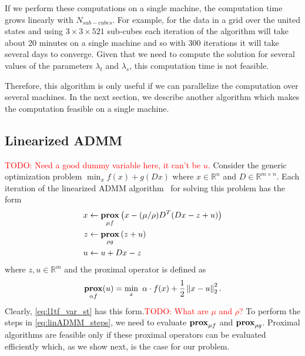 \documentclass{article}
\newcommand{\attn}[1]{\textcolor{red}{TODO: #1}}
\newcommand{\norm}[1]{\left\lVert #1 \right\rVert}
\DeclareMathOperator*{\prox}{\bf prox}
\begin{document}
If we perform these computations on a single machine, the computation
time grows linearly with $N_{sub-cubes}$. For example, for the data in
a grid over the united states and using $3\times3\times521$ sub-cubes
each iteration of the algorithm will take about 20 minutes on a single
machine and so with 300 iterations it will take several days to
converge. Given that we need to compute the solution for several
values of the parameters $\lambda_t$ and $\lambda_s$, this computation
time is not feasible. 

Therefore, this algorithm is only useful if we can parallelize the
computation over several machines. In the next section, we describe
another algorithm which makes the computation feasible on a single
machine. 

\subsection{Linearized ADMM}
\label{sec:linADMM}


\attn{Need a good dummy variable here, it can't be $u$.} Consider the generic optimization problem
$\min_x f(x)+g(Dx)$
where $x\in \mathbb{R}^n$ and $D\in \mathbb{R}^{m\times n}$. Each
iteration of the linearized ADMM
algorithm~\citep{parikh_proximal_2014} for solving this problem 
has the form
\begin{align}
x & \leftarrow \prox_{\mu f} \left(x - (\mu/\rho)D^T (D x - z + u )\right)\\
z & \leftarrow \prox_{\rho g} \left(z + u\right) \label{eq:linADMM_steps}\\
u & \leftarrow u + D x - z
\end{align}
 where $z,u\in \mathbb{R}^m$ and the proximal operator is defined as
\begin{equation}
 \prox_{\alpha f}(u) = \min_x \,\, \alpha \cdot f(x)+\frac{1}{2} \norm{ x-u}_2^2.
\label{eq:linADMM_prox}
\end{equation}
Clearly,
\eqref{eq:l1tf_var_st} has this form.\attn{What are $\mu$ and $\rho$?}
To perform the steps in \eqref{eq:linADMM_steps}, we need to evaluate
$\prox_{\mu f}$ and $\prox_{\rho g}$. Proximal
algorithms are feasible only if these proximal operators can be
evaluated efficiently which, as we show next, is the case for our
problem.  
\end{document}
